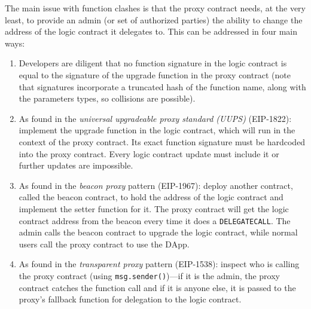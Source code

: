 
The main issue with function clashes is that the proxy contract needs, at the very least, to provide an admin (or set of authorized parties) the ability to change the address of the logic contract it delegates to. This can be addressed in four main ways:

\begin{enumerate}


\item Developers are diligent that no function signature in the logic contract is equal to the signature of the upgrade function in the proxy contract (note that signatures incorporate a truncated hash of the function name, along with the parameters types, so collisions are possible). 

\item As found in the \emph{universal upgradeable proxy standard (UUPS)} (EIP-1822): implement the upgrade function in the logic contract, which will run in the context of the proxy contract. Its exact function signature must be hardcoded into the proxy contract. Every logic contract update must include it or further updates are impossible.

\item As found in the \textit{beacon proxy} pattern (EIP-1967): deploy another contract, called the beacon contract, to hold the address of the logic contract and implement the setter function for it. The proxy contract will get the logic contract address from the beacon every time it does a \texttt{DELEGATECALL}. The admin calls the beacon contract to upgrade the logic contract, while normal users call the proxy contract to use the DApp. 

\item As found in the \textit{transparent proxy} pattern (EIP-1538): inspect who is calling the proxy contract (using \texttt{msg.sender()})---if it is the admin, the proxy contract catches the function call and if it is anyone else, it is passed to the proxy's fallback function for delegation to the logic contract. 

\end{enumerate}

